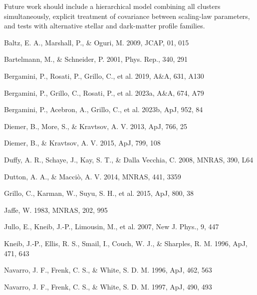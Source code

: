 \documentclass{aa}
\begin{document}
Future work should include a hierarchical model combining all clusters simultaneously, explicit treatment of covariance between scaling-law parameters, and tests with alternative stellar and dark-matter profile families.

\begin{thebibliography}{}
Baltz, E. A., Marshall, P., \& Oguri, M. 2009, JCAP, 01, 015

Bartelmann, M., \& Schneider, P. 2001, Phys. Rep., 340, 291

Bergamini, P., Rosati, P., Grillo, C., et al. 2019, A\&A, 631, A130

Bergamini, P., Grillo, C., Rosati, P., et al. 2023a, A\&A, 674, A79

Bergamini, P., Acebron, A., Grillo, C., et al. 2023b, ApJ, 952, 84

Diemer, B., More, S., \& Kravtsov, A. V. 2013, ApJ, 766, 25

Diemer, B., \& Kravtsov, A. V. 2015, ApJ, 799, 108

Duffy, A. R., Schaye, J., Kay, S. T., \& Dalla Vecchia, C. 2008, MNRAS, 390, L64

Dutton, A. A., \& Macci\`o, A. V. 2014, MNRAS, 441, 3359

Grillo, C., Karman, W., Suyu, S. H., et al. 2015, ApJ, 800, 38

Jaffe, W. 1983, MNRAS, 202, 995

Jullo, E., Kneib, J.-P., Limousin, M., et al. 2007, New J. Phys., 9, 447

Kneib, J.-P., Ellis, R. S., Smail, I., Couch, W. J., \& Sharples, R. M. 1996, ApJ, 471, 643

Navarro, J. F., Frenk, C. S., \& White, S. D. M. 1996, ApJ, 462, 563

Navarro, J. F., Frenk, C. S., \& White, S. D. M. 1997, ApJ, 490, 493
\end{thebibliography}
\end{document}
